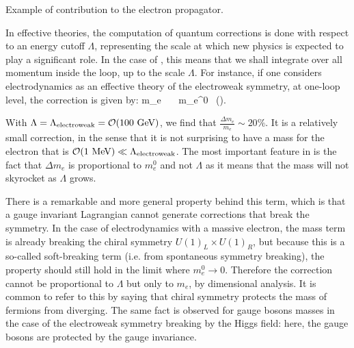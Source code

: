                  {Example of contribution to the electron propagator.}

    In effective theories, the computation of quantum corrections is done with
    respect to an energy cutoff $\Lambda$, representing the scale at which new
    physics is expected to play a significant role. In the case of
    , this means that we
    shall integrate over all momentum inside the loop, up to the scale
    $\Lambda$.  For instance, if one considers electrodynamics as an effective
    theory of the electroweak symmetry, at one-loop level, the correction is
    given by:
    {
        \Delta m_e \, \simeq \, \frac{\alpha}{4\pi} \, m_e^0 \, \left(\right).
    }

    With $\Lambda = \Lambda_{\text{electroweak}} = \mathcal{O}(100~\text{GeV})$, we find
    that $\frac{\Delta m_e}{m_e} \sim 20\%$. It is a relatively small
    correction, in the sense that it is not surprising to have a mass for the
    electron that is $\mathcal{O}(1~\text{MeV}) \ll \Lambda_{\text{electroweak}}$.  The
    most important feature in  is the
    fact that $\Delta m_e$ is proportional to $m_e^0$ and not $\Lambda$ as it
    means that the mass will not skyrocket as $\Lambda$ grows.

    There is a remarkable and more general property behind this term, which is
    that a gauge invariant Lagrangian cannot generate corrections that break the
    symmetry. In the case of electrodynamics with a massive electron, the mass
    term is already breaking the chiral symmetry $U(1)_L \times U(1)_R$, but
    because this is a so-called soft-breaking term (i.e. from spontaneous
    symmetry breaking), the property should still hold in the limit where $m_e^0
    \rightarrow 0$. Therefore the correction cannot be proportional to $\Lambda$
    but only to $m_e$, by dimensional analysis. It is common to refer to this by
    saying that chiral symmetry protects the mass of fermions from diverging.
    The same fact is observed for gauge bosons masses in the case of the
    electroweak symmetry breaking by the Higgs field: here, the gauge bosons are
    protected by the gauge invariance.

